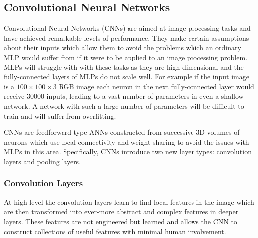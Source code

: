 \subsection{Convolutional Neural Networks}
Convolutional Neural Networks (CNNs) are aimed at image processing tasks and have achieved remarkable levels of performance. 
They make certain assumptions about their inputs which allow them to avoid the problems which an ordinary MLP would suffer from if it were to be applied to an image processing problem. 
MLPs will struggle with with these tasks as they are high-dimensional and the fully-connected layers of MLPs do not scale well. 
For example if the input image is a $100\times{}100\times{}3$ RGB image each neuron in the next fully-connected layer would receive $30000$ inputs, leading to a vast number of parameters in even a shallow network. 
A network with such a large number of parameters will be difficult to train and will suffer from overfitting.

CNNs are feedforward-type ANNs constructed from successive 3D volumes of neurons which use local connectivity and weight sharing to avoid the issues with MLPs in this area. Specifically, CNNs introduce two new layer types: convolution layers and pooling layers.

\subsubsection{Convolution Layers}
At high-level the convolution layers learn to find local features in the image which are then transformed into ever-more abstract and complex features in deeper layers. 
These features are not engineered but learned and allows the CNN to construct collections of useful features with minimal human involvement.


